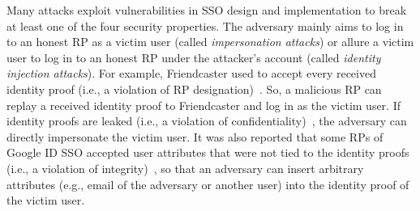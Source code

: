 Many attacks exploit vulnerabilities in SSO design and implementation to break at least one of the four security properties. %
The adversary mainly aims to log in to an honest RP as a victim user (called \emph{impersonation attacks}) or allure a victim user to log in to an honest RP under the attacker's account (called \emph{identity injection attacks}). For example, Friendcaster used to accept every received identity proof (i.e., a violation of RP designation)~\cite{ChenPCTKT14}. So, a malicious RP can replay a received identity proof to Friendcaster and log in as the victim user. If identity proofs are leaked (i.e., a violation of confidentiality)~\cite{WangCW12,ccsSunB12,ArmandoCCCPS13,DiscoveringJCS,dimvaLiM16}, the adversary can directly impersonate the victim user.
It was also reported that some RPs of Google ID SSO accepted user attributes that were not tied to the identity proofs (i.e., a violation of integrity)~\cite{WangCW12}, so that an adversary can insert arbitrary attributes (e.g., email of the adversary or another user) into the identity proof of the victim user. %

